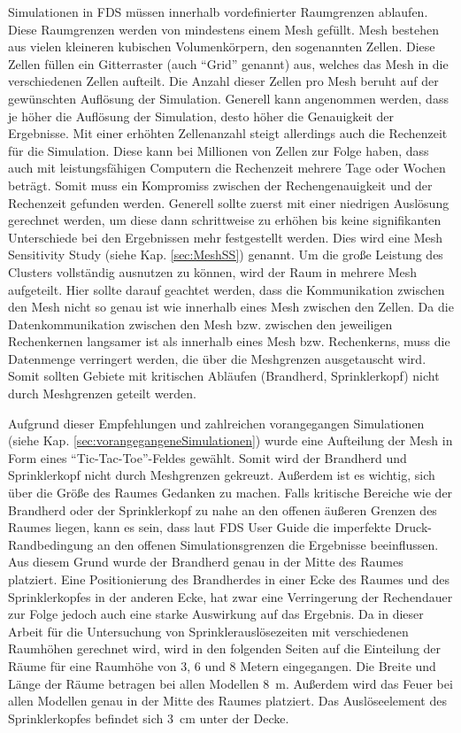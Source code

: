Simulationen in FDS müssen innerhalb vordefinierter Raumgrenzen ablaufen. Diese Raumgrenzen werden von mindestens einem Mesh gefüllt. Mesh bestehen aus vielen kleineren kubischen Volumenkörpern, den sogenannten Zellen. Diese Zellen füllen ein Gitterraster (auch "`Grid"' genannt) aus, welches das Mesh in die verschiedenen Zellen aufteilt. Die Anzahl dieser Zellen pro Mesh beruht auf der gewünschten Auflösung der Simulation. Generell kann angenommen werden, dass je höher die Auflösung der Simulation, desto höher die Genauigkeit der Ergebnisse. Mit einer erhöhten Zellenanzahl steigt allerdings auch die Rechenzeit für die Simulation. Diese kann bei Millionen von Zellen zur Folge haben, dass auch mit leistungsfähigen Computern die Rechenzeit mehrere Tage oder Wochen beträgt. 
Somit muss ein Kompromiss zwischen der Rechengenauigkeit und der Rechenzeit gefunden werden. Generell sollte zuerst mit einer niedrigen Auslösung gerechnet werden, um diese dann schrittweise zu erhöhen bis keine signifikanten Unterschiede bei den Ergebnissen mehr festgestellt werden. Dies wird eine Mesh Sensitivity Study (siehe Kap. \ref{sec:MeshSS}) genannt. Um die große Leistung des Clusters vollständig ausnutzen zu können, wird der Raum in mehrere Mesh aufgeteilt. 
Hier sollte darauf geachtet werden, dass die Kommunikation zwischen den Mesh nicht so genau ist wie innerhalb eines Mesh zwischen den Zellen. Da die Datenkommunikation zwischen den Mesh bzw. zwischen den jeweiligen Rechenkernen langsamer ist als innerhalb eines Mesh bzw. Rechenkerns, muss die Datenmenge verringert werden, die über die Meshgrenzen ausgetauscht wird. Somit sollten Gebiete mit kritischen Abläufen (\zB Brandherd, Sprinklerkopf) nicht durch Meshgrenzen geteilt werden.

Aufgrund dieser Empfehlungen und zahlreichen vorangegangen Simulationen (siehe Kap. \ref{sec:vorangegangeneSimulationen}) wurde eine Aufteilung der Mesh in Form eines "`Tic-Tac-Toe"'-Feldes gewählt. Somit wird der Brandherd und Sprinklerkopf nicht durch Meshgrenzen gekreuzt. 
Außerdem ist es wichtig, sich über die Größe des Raumes Gedanken zu machen. Falls kritische Bereiche wie der Brandherd oder der Sprinklerkopf zu nahe an den offenen äußeren Grenzen des Raumes liegen, kann es sein, dass laut FDS User Guide \cite[S. 73]{FDSUser} die imperfekte Druck-Randbedingung an den offenen Simulationsgrenzen die Ergebnisse beeinflussen. Aus diesem Grund wurde der Brandherd genau in der Mitte des Raumes platziert. Eine Positionierung des Brandherdes in einer Ecke des Raumes und des Sprinklerkopfes in der anderen Ecke, hat zwar eine Verringerung der Rechendauer zur Folge jedoch auch eine starke Auswirkung auf das Ergebnis. 
Da in dieser Arbeit für die Untersuchung von Sprinklerauslösezeiten mit verschiedenen Raumhöhen gerechnet wird, wird in den folgenden Seiten auf die Einteilung der Räume für eine Raumhöhe von 3, 6 und 8 Metern eingegangen. Die Breite und Länge der Räume betragen bei allen Modellen 8~m. Außerdem wird das Feuer bei allen Modellen genau in der Mitte des Raumes platziert. Das Auslöseelement des Sprinklerkopfes befindet sich 3~cm unter der Decke.

